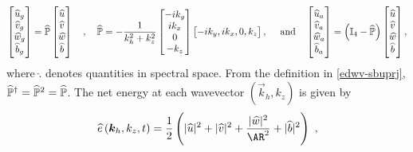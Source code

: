 \documentclass[../Rajarshi-thesis-draft.tex]{subfiles}
\begin{document}
\begin{align}
\label{edwv-sbuprj}
\begin{split}
 \begin{bmatrix}
 \widehat{u}_g \\
 \widehat{v}_g \\
 \widehat{w}_g \\
 \widehat{b}_g \\
 \end{bmatrix}= \widehat{\mathbb{P}}
 \begin{bmatrix}
 \widehat{u} \\
 \widehat{v} \\
 \widehat{w} \\
 \widehat{b} \\
 \end{bmatrix} \quad , \quad
		\widehat{\mathbb{P}} = -\frac{1}{k_h^2 + k_z^2}\begin{bmatrix}
 -ik_y \\
 ik_x \\
 0\\
 -k_z
 \end{bmatrix}
 \begin{bmatrix}
 -ik_y,ik_x,0,k_z
 \end{bmatrix},\quad \mbox{ and} \quad
	\begin{bmatrix}
 \widehat{u}_a \\
 \widehat{v}_a \\
 \widehat{w}_a \\
 \widehat{b}_a \\
 \end{bmatrix}= \left( \mathbb{I}_{4} - \widehat{\mathbb{P}} \right)
 \begin{bmatrix}
 \widehat{u} \\
 \widehat{v} \\
 \widehat{w} \\
 \widehat{b} \\
 \end{bmatrix} , 
\end{split}
\end{align}
where $\hat{.}$ denotes quantities in spectral space. From the definition in \eqref{edwv-sbuprj}, $\widehat{\mathbb{P}}^{\dagger} = \widehat{\mathbb{P}}^2 = \widehat{\mathbb{P}}$. The net energy at each wavevector $(\vec{k}_h , k_z)$ is given by 
\begin{align}
 \label{edwv-e3d}
 \begin{split}
 \hat{e}\left( \vec{k}_h, k_z,t \right) = \frac{1}{2}\left( |\hat{u}|^2 + |\hat{v}|^2 + \frac{|\hat{w}|^2}{\AR^2} + |\hat{b}|^2\right) \ ,
 \end{split}
\end{align}
\end{document}
